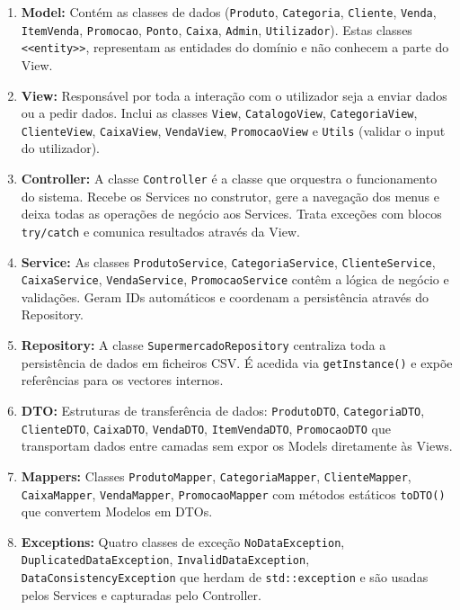 \documentclass[a4paper]{llncs}
\begin{document}
\begin{enumerate}
    \item \textbf{Model:} Contém as classes de dados (\texttt{Produto}, \texttt{Categoria}, \texttt{Cliente}, \texttt{Venda}, \texttt{ItemVenda}, \texttt{Promocao}, \texttt{Ponto}, \texttt{Caixa}, \texttt{Admin}, \texttt{Utilizador}). Estas classes \texttt{<<entity>>}, representam as entidades do domínio e não conhecem a parte do View.
    \item \textbf{View:} Responsável por toda a interação com o utilizador seja a enviar dados ou a pedir dados. Inclui as classes \texttt{View}, \texttt{CatalogoView}, \texttt{CategoriaView}, \texttt{ClienteView}, \texttt{CaixaView}, \texttt{VendaView}, \texttt{PromocaoView} e \texttt{Utils} (validar o input do utilizador).
    \item \textbf{Controller:} A classe \texttt{Controller} é a classe que orquestra o funcionamento do sistema. Recebe os Services no construtor, gere a navegação dos menus e deixa todas as operações de negócio aos Services. Trata exceções com blocos \texttt{try/catch} e comunica resultados através da View.
    \item \textbf{Service:} As classes \texttt{ProdutoService}, \texttt{CategoriaService}, \texttt{ClienteService}, \texttt{CaixaService}, \texttt{VendaService}, \texttt{PromocaoService} contêm a lógica de negócio e validações. Geram IDs automáticos e coordenam a persistência através do Repository.
    \item \textbf{Repository:} A classe \texttt{SupermercadoRepository}  centraliza toda a persistência de dados em ficheiros CSV. É acedida via \texttt{getInstance()} e expõe referências para os vectores internos.
    \item \textbf{DTO:} Estruturas de transferência de dados: \texttt{ProdutoDTO}, \texttt{CategoriaDTO}, \texttt{ClienteDTO}, \texttt{CaixaDTO}, \texttt{VendaDTO}, \texttt{ItemVendaDTO}, \texttt{PromocaoDTO} que transportam dados entre camadas sem expor os Models diretamente às Views.
    \item \textbf{Mappers:} Classes \texttt{ProdutoMapper}, \texttt{CategoriaMapper}, \texttt{ClienteMapper}, \texttt{CaixaMapper}, \texttt{VendaMapper}, \texttt{PromocaoMapper} com métodos estáticos \texttt{toDTO()} que convertem Modelos em DTOs.
    \item \textbf{Exceptions:} Quatro classes de exceção \texttt{NoDataException}, \texttt{DuplicatedDataException}, \texttt{InvalidDataException}, \texttt{DataConsistencyException} que herdam de \texttt{std::exception} e são usadas pelos Services e capturadas pelo Controller.
\end{enumerate}
\end{document}
